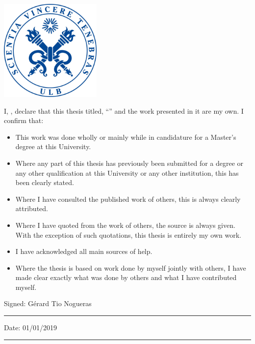 \documentclass[
11pt, %
english, %
singlespacing, %
headsepline, %
]{MastersDoctoralThesis} %
\begin{document}
\begin{titlepage}
\begin{center}
\vfill

\includegraphics[width=5cm]{img/Logo.jpg} %
 
\vfill
\end{center}
\end{titlepage}


\begin{declaration}
\addchaptertocentry{\authorshipname} %
\noindent I, \authorname, declare that this thesis titled, \enquote{\ttitle} and the work presented in it are my own. I confirm that:

\begin{itemize}[noitemsep] 
\item This work was done wholly or mainly while in candidature for a Master's degree at this University.
\item Where any part of this thesis has previously been submitted for a degree or any other qualification at this University or any other institution, this has been clearly stated.
\item Where I have consulted the published work of others, this is always clearly attributed.
\item Where I have quoted from the work of others, the source is always given. With the exception of such quotations, this thesis is entirely my own work.
\item I have acknowledged all main sources of help.
\item Where the thesis is based on work done by myself jointly with others, I have made clear exactly what was done by others and what I have contributed myself.\\
\end{itemize}
 
\noindent Signed: Gérard Tio Nogueras\\
\rule[0.5em]{25em}{0.5pt} %
 
\noindent Date: 01/01/2019\\
\rule[0.5em]{25em}{0.5pt} %
\end{declaration}
\end{document}
